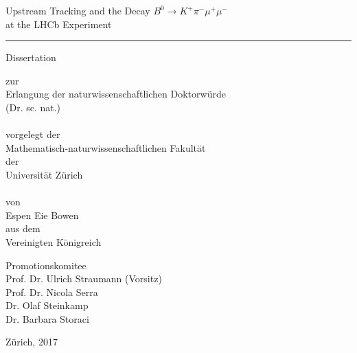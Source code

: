 \begin{titlepage}
 
\vspace*{-1.5cm}

\begin{center}
{\Large
Upstream Tracking and the Decay $B^{0} \to K^{+}\pi^{-}\mu^{+}\mu^{-}$\\ at the LHCb Experiment

\rule{\linewidth}{0.5pt}
}

\vspace*{1cm}

{\large
Dissertation \\
}

zur \\
Erlangung der naturwissenschaftlichen Doktorw\"urde \\ (Dr. sc. nat.) \\~\\
vorgelegt der \\ Mathematisch-naturwissenschaftlichen Fakult\"at \\
der \\
Universit\"at Z\"urich \\~\\
von \\
Espen Eie Bowen \\
aus dem \\
Vereinigten K\"onigreich \\

\vspace*{1cm}

Promotionskomitee \\
Prof. Dr. Ulrich Straumann (Vorsitz) \\
Prof. Dr. Nicola Serra \\
Dr. Olaf Steinkamp \\
Dr. Barbara Storaci \\

\vspace*{1cm}

Z\"urich, 2017

\end{center}
\end{titlepage}